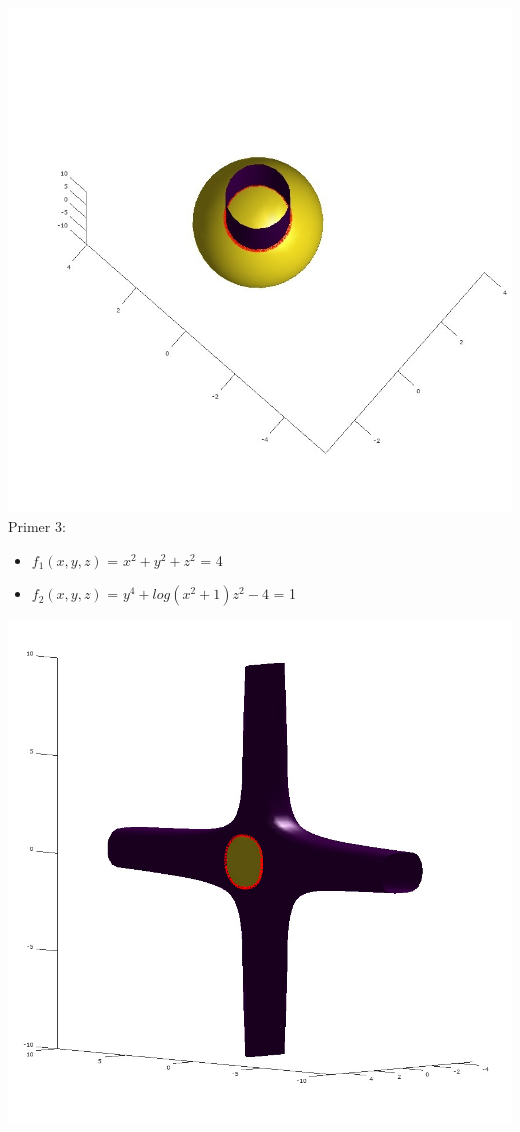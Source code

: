 \documentclass[]{article}
\begin{document}
	\includegraphics[scale=0.3]{primer2_2}
	\\
	Primer 3:
	\begin{itemize}  
		\item $f_{1}(x,y,z)$ = $x^2 + y^2 + z^2$ = 4
		\item $f_{2}(x,y,z)$ = $y^4 + log(x^2 + 1)z^2 - 4$ = 1
	\end{itemize}
	\includegraphics[scale=0.3]{primer3_1}
\end{document}
